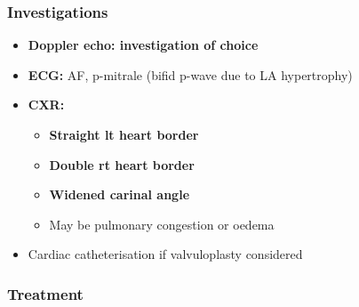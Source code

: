 \documentclass[
  12pt,
]{memoir}
\providecommand{\tightlist}{%
  \setlength{\itemsep}{0pt}\setlength{\parskip}{0pt}}
\begin{document}
\hypertarget{investigations-9}{%
\subsubsection{Investigations}\label{investigations-9}}

\begin{itemize}
\tightlist
\item
  \textbf{Doppler echo: investigation of choice}
\item
  \textbf{ECG:} AF, p-mitrale (bifid p-wave due to LA hypertrophy)
\item
  \textbf{CXR:}

  \begin{itemize}
  \tightlist
  \item
    \textbf{Straight lt heart border}
  \item
    \textbf{Double rt heart border}
  \item
    \textbf{Widened carinal angle}
  \item
    May be pulmonary congestion or oedema
  \end{itemize}
\item
  Cardiac catheterisation if valvuloplasty considered
\end{itemize}

\hypertarget{treatment-1}{%
\subsubsection{Treatment}\label{treatment-1}}
\end{document}
